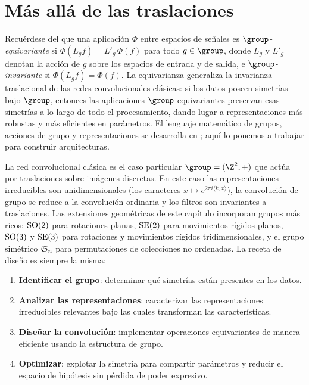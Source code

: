 \section{M\'as all\'a de las traslaciones}
\label{sec:groups:beyond}

Recu\'erdese del  que una aplicaci\'on $\Phi$ entre espacios de
se\~nales es \emph{$\group$-equivariante} si $\Phi(L_g f) = L'_g\,\Phi(f)$ para
todo $g \in \group$, donde $L_g$ y $L'_g$ denotan la acci\'on de $g$ sobre los
espacios de entrada y de salida, e \emph{$\group$-invariante} si $\Phi(L_g f) =
\Phi(f)$. La equivarianza generaliza la invarianza traslacional de las redes
convolucionales cl\'asicas: si los datos poseen simetr\'ias bajo $\group$,
entonces las aplicaciones $\group$-equivariantes preservan esas simetr\'ias a lo
largo de todo el procesamiento, dando lugar a representaciones m\'as robustas y
m\'as eficientes en par\'ametros. El lenguaje matem\'atico de grupos, acciones de
grupo y representaciones se desarrolla en ; aqu\'i lo
ponemos a trabajar para construir arquitecturas.

La red convolucional cl\'asica es el caso particular $\group = (\Z^2, +)$ que
act\'ua por traslaciones sobre im\'agenes discretas. En este caso las
representaciones irreducibles son unidimensionales (los caracteres $x \mapsto
e^{2\pi i \langle k, x\rangle}$), la convoluci\'on de grupo se reduce a la
convoluci\'on ordinaria y los filtros son invariantes a traslaciones. Las
extensiones geom\'etricas de este cap\'itulo incorporan grupos m\'as ricos:
$\operatorname{SO}(2)$ para rotaciones planas, $\operatorname{SE}(2)$ para movimientos r\'igidos planos,
$\operatorname{SO}(3)$ y $\operatorname{SE}(3)$ para rotaciones y movimientos r\'igidos tridimensionales, y
el grupo sim\'etrico $\mathfrak{S}_n$ para permutaciones de colecciones no ordenadas. La
receta de dise\~no es siempre la misma:
\begin{enumerate}
  \item \textbf{Identificar el grupo}: determinar qu\'e simetr\'ias est\'an
        presentes en los datos.
  \item \textbf{Analizar las representaciones}: caracterizar las
        representaciones irreducibles relevantes bajo las cuales transforman las
        caracter\'isticas.
  \item \textbf{Dise\~nar la convoluci\'on}: implementar operaciones
        equivariantes de manera eficiente usando la estructura de grupo.
  \item \textbf{Optimizar}: explotar la simetr\'ia para compartir par\'ametros y
        reducir el espacio de hip\'otesis sin p\'erdida de poder expresivo.
\end{enumerate}


